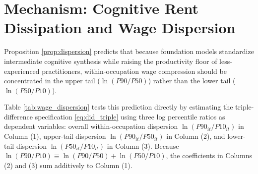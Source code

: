 \documentclass[12pt]{article}
\begin{document}
\section{Mechanism: Cognitive Rent Dissipation and Wage Dispersion}
\label{sec:mechanisms}

Proposition \ref{prop:dispersion} predicts that because foundation models standardize intermediate cognitive synthesis while raising the productivity floor of less-experienced practitioners, within-occupation wage compression should be concentrated in the upper tail ($\ln(P90/P50)$) rather than the lower tail ($\ln(P50/P10)$).

Table \ref{tab:wage_dispersion} tests this prediction directly by estimating the triple-difference specification \eqref{eq:did_triple} using three log percentile ratios as dependent variables: overall within-occupation dispersion $\ln(P90_{it}/P10_{it})$ in Column (1), upper-tail dispersion $\ln(P90_{it}/P50_{it})$ in Column (2), and lower-tail dispersion $\ln(P50_{it}/P10_{it})$ in Column (3). Because $\ln(P90/P10) \equiv \ln(P90/P50) + \ln(P50/P10)$, the coefficients in Columns (2) and (3) sum additively to Column (1).
\end{document}
